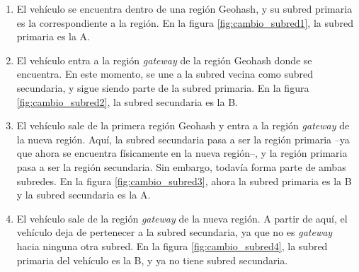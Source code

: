 \begin{enumerate}
  \item El vehículo se encuentra dentro de una región Geohash, y su subred
  primaria es la correspondiente a la región. En la figura
  \ref{fig:cambio_subred1}, la subred primaria es la A.
  \item El vehículo entra a la región \textit{gateway} de la región Geohash
  donde se encuentra. En este momento, se une a la subred vecina como subred
  secundaria, y sigue siendo parte de la subred primaria. En la figura
  \ref{fig:cambio_subred2}, la subred secundaria es la B.
  \item El vehículo sale de la primera región Geohash y entra a la región
  \textit{gateway} de la nueva región. Aquí, la subred secundaria pasa a ser la
  región primaria --ya que ahora se encuentra físicamente en la nueva región--,
  y la región primaria pasa a ser la región secundaria. Sin embargo, todavía
  forma parte de ambas subredes. En la figura \ref{fig:cambio_subred3}, ahora la
  subred primaria es la B y la subred secundaria es la A.
  \item El vehículo sale de la región \textit{gateway} de la nueva región. A
  partir de aquí, el vehículo deja de pertenecer a la subred secundaria, ya que
  no es \textit{gateway} hacia ninguna otra subred. En la figura
  \ref{fig:cambio_subred4}, la subred primaria del vehículo es la B, y ya no
  tiene subred secundaria.
\end{enumerate}


